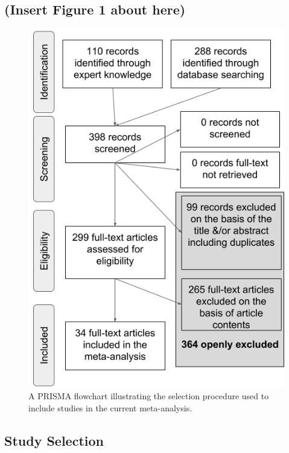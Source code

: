 \documentclass[man]{apa6}
\theoremstyle{definition}
\theoremstyle{definition}
\theoremstyle{definition}
\theoremstyle{remark}
\begin{document}
\subsection{(Insert Figure 1 about
here)}\label{insert-figure-1-about-here}

\begin{figure}
\centering
\includegraphics{figures/Figure_1_PRISMA_MA_Mispronunciation.png}
\caption{\label{fig:PRISMA-image}A PRISMA flowchart illustrating the
selection procedure used to include studies in the current
meta-analysis.}
\end{figure}

\subsection{Study Selection}\label{study-selection}
\end{document}
